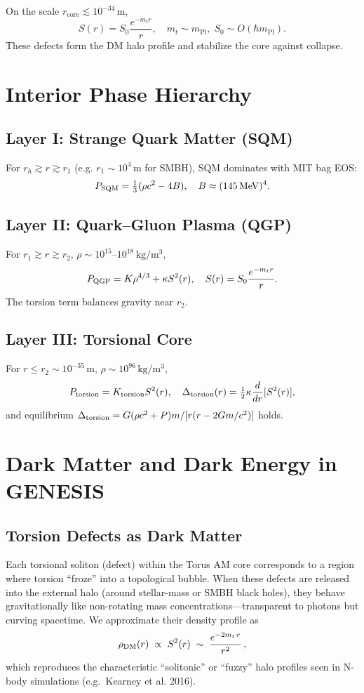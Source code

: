 \documentclass{article}
\begin{document}
On the scale $r_{\mathrm{core}}\lesssim10^{-34}\,\mathrm{m}$,
\[
  S(r)=S_0\frac{e^{-m_tr}}{r},
  \quad m_t\sim m_{\mathrm{Pl}},\;S_0\sim O(\hbar m_{\mathrm{Pl}}).
\]
These defects form the DM halo profile and stabilize the core against collapse.

\section{Interior Phase Hierarchy}\label{sec:interior_phases}
\subsection{Layer I: Strange Quark Matter (SQM)}
For $r_h\gtrsim r\gtrsim r_1$ (e.g. $r_1\sim10^4\,$m for SMBH), SQM dominates with MIT bag EOS:
\[
  P_{\rm SQM} = \tfrac13(\rho c^2 - 4B),\quad B\approx(145\,\mathrm{MeV})^4.
\]

\subsection{Layer II: Quark–Gluon Plasma (QGP)}
For $r_1\gtrsim r\gtrsim r_2$, $\rho\sim10^{15}$–$10^{18}\,\mathrm{kg/m^3}$,
\[
  P_{\rm QGP} = K\rho^{4/3} + \kappa S^2(r),\quad S(r)=S_0\frac{e^{-m_tr}}{r}.
\]
The torsion term balances gravity near $r_2$.

\subsection{Layer III: Torsional Core}
For $r\le r_2\sim10^{-35}\,$m, $\rho\sim10^{96}\,\mathrm{kg/m^3}$,
\[
  P_{\rm torsion}=K_{\rm torsion}S^2(r),\quad
  \Delta_{\rm torsion}(r)=\tfrac12\kappa\frac{d}{dr}[S^2(r)],
\]
and equilibrium $\Delta_{\rm torsion}=G(\rho c^2+P)m/[r(r-2Gm/c^2)]$ holds.

\section{Dark Matter and Dark Energy in GENESIS}
\label{sec:dm_de}

\subsection{Torsion Defects as Dark Matter}
Each torsional soliton (defect) within the Torus AM core corresponds to a region where torsion “froze” into a topological bubble. When these defects are released into the external halo (around stellar-mass or SMBH black holes), they behave gravitationally like non-rotating mass concentrations—transparent to photons but curving spacetime. We approximate their density profile as
\[
  \rho_{\rm DM}(r)\;\propto\; S^2(r)
  \;\sim\;\frac{e^{-2m_t\,r}}{r^2}\,,
\]
which reproduces the characteristic “solitonic” or “fuzzy” halo profiles seen in N-body simulations (e.g.\ Kearney et al. 2016).
\end{document}
